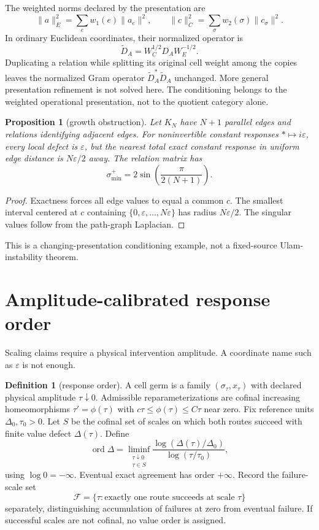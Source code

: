 \documentclass[11pt]{article}
\newtheorem{proposition}[theorem]{Proposition}
\theoremstyle{definition}
\newtheorem{definition}[theorem]{Definition}
\theoremstyle{remark}
\newcommand{\ord}{\operatorname{ord}}
\begin{document}
The weighted norms declared by the presentation are
\[
\|a\|_E^2=\sum_e w_1(e)\|a_e\|^2,\qquad
\|c\|_C^2=\sum_\sigma w_2(\sigma)\|c_\sigma\|^2.
\]
In ordinary Euclidean coordinates, their normalized operator is
\[
\widetilde D_A=W_C^{1/2}D_AW_E^{-1/2}.
\]
Duplicating a relation while splitting its original cell weight among the
copies leaves the normalized Gram operator
\(\widetilde D_A^\ast\widetilde D_A\) unchanged. More general presentation
refinement is not solved here. The conditioning belongs to the weighted
operational presentation, not to the quotient category alone.

\begin{proposition}[growth obstruction]
\label{prop:chain}
Let \(K_N\) have \(N+1\) parallel edges and relations identifying adjacent
edges. For noninvertible constant responses
\(\ast\mapsto i\varepsilon\), every local defect is \(\varepsilon\), but the
nearest total exact constant response in uniform edge distance is
\(N\varepsilon/2\) away. The relation matrix has
\[
\sigma_{\min}^+=
2\sin\left(\frac{\pi}{2(N+1)}\right).
\]
\end{proposition}

\begin{proof}
Exactness forces all edge values to equal a common \(c\). The smallest
interval centered at \(c\) containing
\(\{0,\varepsilon,\ldots,N\varepsilon\}\) has radius
\(N\varepsilon/2\). The singular values follow from the path-graph
Laplacian.
\end{proof}

This is a changing-presentation conditioning example, not a fixed-source
Ulam-instability theorem.

\section{Amplitude-calibrated response order}

Scaling claims require a physical intervention amplitude. A coordinate name
such as \(\varepsilon\) is not enough.

\begin{definition}[response order]
A cell germ is a family \((\sigma_\tau,x_\tau)\) with declared physical
amplitude \(\tau\downarrow0\). Admissible reparameterizations are cofinal
increasing homeomorphisms \(\tau'=\phi(\tau)\) with
\(c\tau\le\phi(\tau)\le C\tau\) near zero. Fix reference units
\(\Delta_0,\tau_0>0\). Let \(S\) be the cofinal set of scales on which both
routes succeed with finite value defect \(\Delta(\tau)\). Define
\[
\ord\Delta=
\liminf_{\substack{\tau\downarrow0\\ \tau\in S}}
\frac{\log(\Delta(\tau)/\Delta_0)}
{\log(\tau/\tau_0)},
\]
using \(\log0=-\infty\). Eventual exact agreement has order \(+\infty\).
Record the failure-scale set
\[
\mathcal F=\{\tau:\text{exactly one route succeeds at scale }\tau\}
\]
separately, distinguishing accumulation of failures at zero from eventual
failure. If successful scales are not cofinal, no value order is assigned.
\end{definition}
\end{document}
